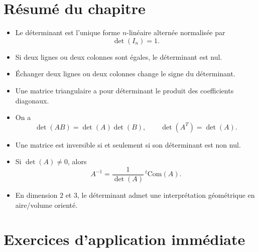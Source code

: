 \documentclass[11pt,a4paper]{article}
\theoremstyle{remark}
\begin{document}
\section{Résumé du chapitre}

\begin{itemize}
    \item Le déterminant est l’unique forme \(n\)-linéaire alternée normalisée par
    \[
    \det(I_n)=1.
    \]
    \item Si deux lignes ou deux colonnes sont égales, le déterminant est nul.
    \item Échanger deux lignes ou deux colonnes change le signe du déterminant.
    \item Une matrice triangulaire a pour déterminant le produit des coefficients diagonaux.
    \item On a
    \[
    \det(AB)=\det(A)\det(B),
    \qquad
    \det(A^T)=\det(A).
    \]
    \item Une matrice est inversible si et seulement si son déterminant est non nul.
    \item Si \(\det(A)\neq 0\), alors
    \[
    A^{-1}=\frac{1}{\det(A)}\,{}^t\!\mathrm{Com}(A).
    \]
    \item En dimension \(2\) et \(3\), le déterminant admet une interprétation géométrique en aire/volume orienté.
\end{itemize}

\section*{Exercices d’application immédiate}
\end{document}
